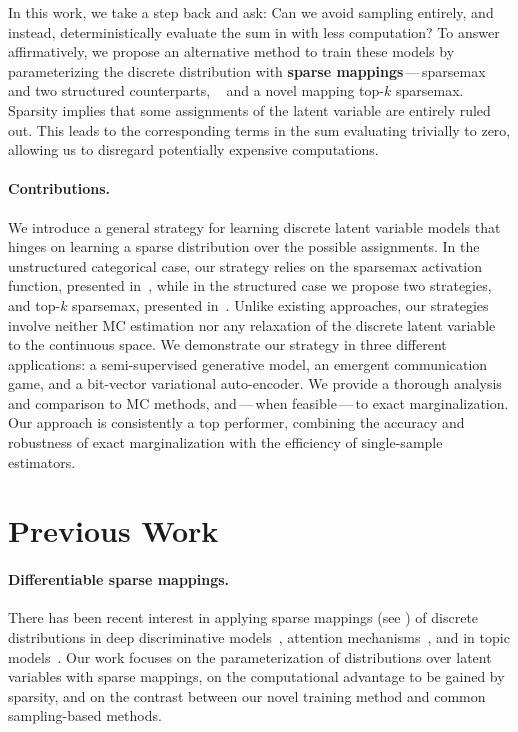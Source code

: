 In this work, we take a step back and ask: Can we avoid sampling
entirely, and instead, deterministically evaluate the sum in  with less
computation? To answer affirmatively, we propose an alternative
method to train these models by parameterizing the discrete
distribution with {\bf sparse
        mappings}\,---\,sparsemax~\citep{sparsemax} and two
structured counterparts, \smap~\citep{sparsemap} and a
novel mapping top-$k$ sparsemax. Sparsity implies that some
assignments of the latent variable are entirely ruled out. This leads
to the corresponding terms in the sum evaluating trivially to zero,
allowing us to disregard potentially expensive computations.

\paragraph*{Contributions.} We introduce a general strategy for
learning discrete latent variable models that hinges on
learning a sparse distribution over the possible assignments. In the
unstructured categorical case, our strategy relies on the sparsemax
activation function, presented in~, while in the
structured case we propose two strategies, \smap and top-$k$
sparsemax, presented in~. Unlike existing
approaches, our strategies involve neither MC estimation nor any
relaxation of the discrete latent variable to the continuous space.
We demonstrate our strategy in three different applications: a
semi-supervised generative model, an emergent communication game, and
a bit-vector variational auto-encoder. We provide a thorough analysis
and comparison to MC methods, and\,---\,when feasible\,---\,to exact
marginalization. Our approach is consistently a top performer,
combining the accuracy and robustness of exact marginalization with
the efficiency of single-sample estimators.

\section{Previous Work}

\paragraph*{Differentiable sparse mappings.} There has been recent
interest in applying sparse mappings (see ) of discrete distributions in
deep discriminative models~\citep{sparsemax,
    sparsemap, fusedmax, entmax, sparsemapcg}, attention
mechanisms~\citep{malaviya2018sparse, shao2019ssn,
    maruf2019selective, correia2019adaptively}, and in topic
models~\citep{caothesis}. Our work focuses on the parameterization of
distributions over latent variables with sparse mappings, on the
computational advantage to be gained by sparsity, and on the contrast
between our novel training method and common sampling-based methods.

